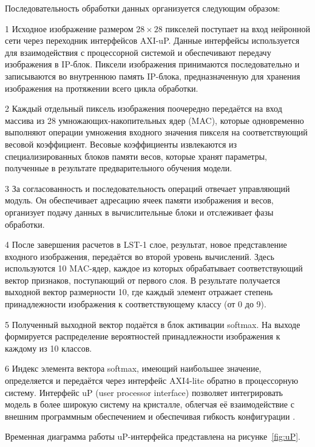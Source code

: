 
Последовательность обработки данных организуется следующим образом:

  1 Исходное изображение размером \(28\times28\) пикселей поступает на вход 
нейронной сети через переходник интерфейсов AXI-uP. Данные интерфейсы 
используется для взаимодействия с процессорной системой и обеспечивают передачу 
изображения в IP-блок. Пиксели изображения принимаются последовательно и 
записываются во внутреннюю память IP-блока, предназначенную для хранения 
изображения на протяжении всего цикла обработки.

  2 Каждый отдельный пиксель изображения поочередно передаётся на вход массива 
из 28 умножающих-накопительных ядер (MAC), которые одновременно выполняют 
операции умножения входного значения пикселя на соответствующий весовой 
коэффициент. Весовые коэффициенты извлекаются из специализированных блоков 
памяти весов, которые хранят параметры, полученные в результате 
предварительного обучения модели.

  3 За согласованность и последовательность операций отвечает управляющий 
модуль. Он обеспечивает адресацию ячеек памяти изображения и весов, организует 
подачу данных в вычислительные блоки и отслеживает фазы обработки.

  4 После завершения расчетов в LST-1 слое, результат, новое 
представление входного изображения, передаётся во второй уровень вычислений. 
Здесь используются 10 MAC-ядер, каждое из которых обрабатывает соответствующий 
вектор признаков, поступающий от первого слоя. В результате получается выходной 
вектор размерности 10, где каждый элемент отражает степень принадлежности 
изображения к соответствующему классу (от 0 до 9).

  5 Полученный выходной вектор подаётся в блок активации softmax. 
На выходе формируется распределение 
вероятностей принадлежности изображения к каждому из 10 классов.

  6 Индекс элемента вектора softmax, имеющий наибольшее значение, определяется и передаётся через интерфейс AXI4-lite 
обратно в процессорную систему. Интерфейс uP (user processor 
interface) позволяет интегрировать модель в более широкую систему на кристалле, 
облегчая её взаимодействие с внешним программным обеспечением и обеспечивая 
гибкость конфигурации \cite{chu_fpga}.

  Временная диаграмма работы uP-интерфейса представлена на 
рисунке~\ref{fig:uP}.

